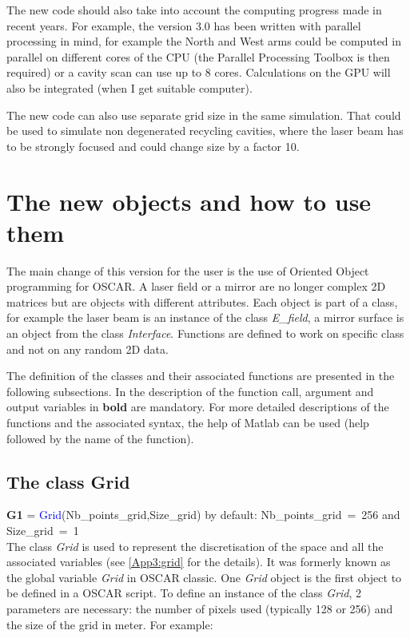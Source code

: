  The new code should also take into account the computing progress made in recent years. For example, the version 3.0 has been written with parallel processing in mind, for example the North and West arms could be computed in parallel on different cores of the CPU (the Parallel Processing Toolbox is then required) or a cavity scan can use up to 8 cores. Calculations on the GPU will also be integrated (when I get suitable computer).

 The new code can also use separate grid size in the same simulation. That could be used to simulate non degenerated recycling cavities, where the laser beam has to be strongly focused and could change size by a factor 10.

\section{The new objects and how to use them}

The main change of this version for the user is the use of Oriented Object programming for OSCAR. A laser field or a mirror are no longer complex 2D matrices but are objects with different attributes. Each object is part of a class, for example the laser beam is an instance of the class \textsl{E\_field}, a mirror surface is an object from the class \textsl{Interface}. Functions are defined to work on specific class and not on any random 2D data.

The definition of the classes and their associated functions are presented in the following subsections. In the description of the function call, argument and output variables in \textbf{bold} are mandatory. For more detailed descriptions of the functions and the associated syntax, the help of Matlab can be used (help followed by the name of the function).

\subsection{The class Grid}
\textbf{G1} = \textcolor{blue}{Grid}(Nb\_points\_grid,Size\_grid)
by default: Nb\_points\_grid~=~256 and Size\_grid~=~1 \\

The class \textsl{Grid} is used to represent the discretisation of the space and all the associated variables (see \ref{App3:grid} for the details). It was formerly known as the global variable \textsl{Grid} in OSCAR classic. One \textsl{Grid} object is the first object to be defined in a OSCAR script. To define an instance of the class \textsl{Grid}, 2 parameters are necessary: the number of pixels used (typically 128 or 256) and the size of the grid in meter. For example:

